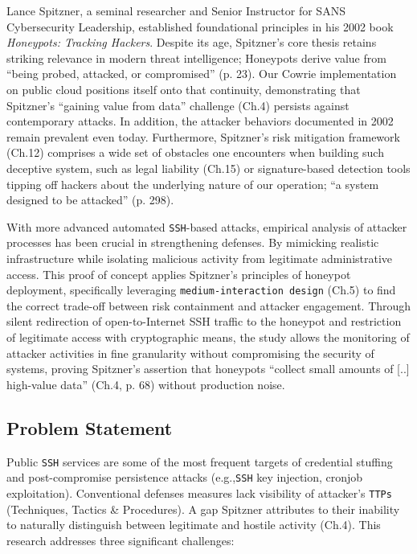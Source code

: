 \documentclass{cls/ULBreport}
\begin{document}
    Lance Spitzner, a seminal researcher and Senior Instructor for SANS Cybersecurity Leadership, established foundational principles in his 2002 book \textit{Honeypots: Tracking Hackers}. 
    Despite its age, Spitzner's core thesis retains striking relevance in modern threat intelligence; Honeypots derive value from \enquote{being probed, attacked, or compromised} (p. 23). Our Cowrie implementation on public cloud positions itself onto that continuity, demonstrating that Spitzner's \enquote{gaining value from data} challenge (Ch.4) persists against contemporary attacks. In addition, the attacker behaviors documented in 2002 remain prevalent even today. Furthermore, Spitzner's risk mitigation framework (Ch.12) comprises a wide set of obstacles one encounters when building such deceptive system, such as legal liability (Ch.15) or signature-based detection tools tipping off hackers about the underlying nature of our operation; \enquote{a system designed to be attacked} (p. 298). 
    
    
    With more advanced automated \texttt{SSH}-based attacks, empirical analysis of attacker processes has been crucial in strengthening defenses. By mimicking realistic infrastructure while isolating malicious activity from legitimate administrative access. This proof of concept applies Spitzner's principles of honeypot deployment, specifically leveraging \texttt{medium-interaction design} (Ch.5) to find the correct trade-off between risk containment and attacker engagement. Through silent redirection of open-to-Internet SSH traffic to the honeypot and restriction of legitimate access with cryptographic means, the study allows the monitoring of attacker activities in fine granularity without compromising the security of systems, proving Spitzner's assertion that honeypots \enquote{collect small amounts of [..] high-value data} (Ch.4, p. 68) without production noise.  

        \subsection{Problem Statement} 
        Public \texttt{SSH} services are some of the most frequent targets of credential stuffing and post-compromise persistence attacks (e.g.,\texttt{SSH} key injection, cronjob exploitation). Conventional defenses measures lack visibility of attacker's \texttt{TTPs} (Techniques, Tactics \& Procedures). A gap Spitzner attributes to their inability to naturally distinguish between legitimate and hostile activity (Ch.4). This research addresses three significant challenges: 
            
\end{document}
